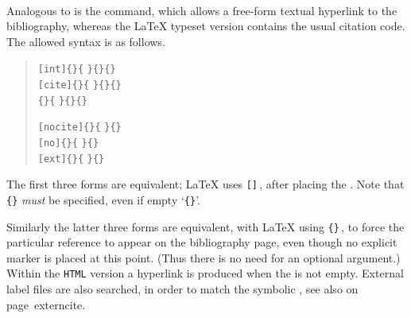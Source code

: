 %
\paragraph*{\label{hypercite}}
\begin{changebar}
Analogous to  is the  command,
which allows a free-form textual hyperlink to the bibliography,
whereas the \LaTeX{} typeset version contains the usual citation code.
The allowed syntax is as follows.
\begin{small}
\begin{quote}
\verb|[int]{|\verb|}{|%
\verb|}{|\verb|}{|\verb|}|\\
\verb|[cite]{|\verb|}{|%
\verb|}{|\verb|}{|\verb|}|\\
\verb|{|\verb|}{|%
\verb|}{|\verb|}{|\verb|}|\medskip

\verb|[nocite]{|\verb|}{|%
\verb|}{|\verb|}|\\
\verb|[no]{|\verb|}{|%
\verb|}{|\verb|}|\\
\verb|[ext]{|\verb|}{|%
\verb|}{|\verb|}|
\end{quote}
\end{small}
The first three forms are equivalent; 
\LaTeX{} uses \verb|[|\verb|]|\,,
after placing the .
Note that \verb|{|\verb|}| \emph{must} be specified, 
even if empty `\verb|{}|'.

Similarly the latter three forms are equivalent, 
with \LaTeX{} using \verb|{|\verb|}|\,, 
to force the particular reference to appear on the bibliography page, 
even though no explicit marker is placed at this point.
(Thus there is no need for an optional   argument.)\html{\\}
Within the \texttt{HTML} version a hyperlink is produced when the  
is not empty. External label files are also searched, 
in order to match the symbolic , see also 
\hyperref[page]{}{ on page~}{}{externcite}.


\end{changebar}
